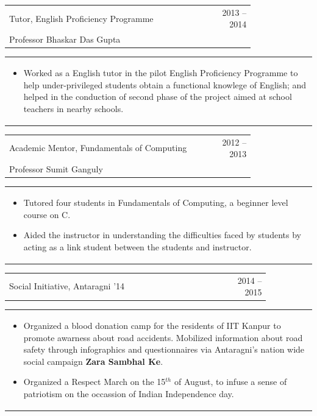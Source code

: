 \documentclass[a4paper,10pt]{article} %
\newcommand{\lproject}[4]{
    \begin{tabular}{p{0.80\linewidth}r}
        \textcolor{NavyBlue}{#2} & \multicolumn{1}{m{4cm}}{\raggedleft \textsc{#1}}\\
        #3
    \end{tabular}
    \begin{tabular}{p{\linewidth}}
    \vspace{-0.3cm}
        \footnotesize{#4}
    \end{tabular}
    \vspace{-0.5cm}
}
\newcommand{\iproject}[3]{
    \begin{tabular}{p{0.85\linewidth}r}
        \textcolor{NavyBlue}{#2} & \multicolumn{1}{m{3cm}}{\raggedleft \textsc{#1}}\\
    \end{tabular}
    \begin{tabular}{p{\linewidth}}
    \vspace{-0.3cm}
        \footnotesize{#3}
    \end{tabular}
    \vspace{-0.5cm}
}
\begin{document}
\lproject {2013 -- 2014}
          {Tutor, English Proficiency Programme}
          {Professor Bhaskar Das Gupta}
          {
               \begin{itemize}[leftmargin=0.5cm]
                   \item Worked as a English tutor in the pilot English Proficiency Programme to help
                       under-privileged students obtain a functional knowlege of English; and helped in the
                       conduction of second phase of the project aimed at school teachers in nearby schools.
               \end{itemize}
          }

\lproject {2012 -- 2013}
          {Academic Mentor, Fundamentals of Computing}
          {Professor Sumit Ganguly}
          {
               \begin{itemize}[leftmargin=0.5cm]
                   \item Tutored four students in Fundamentals of Computing, a beginner level course on C.
                   \item Aided the instructor in understanding the difficulties faced by students by acting as a link
                       student between the students and instructor.
               \end{itemize}
          }

\iproject {2014 -- 2015}
          {Social Initiative, Antaragni '14}
          {
               \begin{itemize}[leftmargin=0.5cm]
                   \item Organized a blood donation camp for the residents of IIT Kanpur to promote awarness
                       about road accidents.  Mobilized information about road safety through infographics and questionnaires
                       via Antaragni's nation wide social campaign \textbf{Zara Sambhal Ke}.
                   \item Organized a Respect March on the 15$^{th}$ of August, to infuse a sense of patriotism
                       on the occassion of Indian Independence day.
               \end{itemize}
          }
\end{document}

